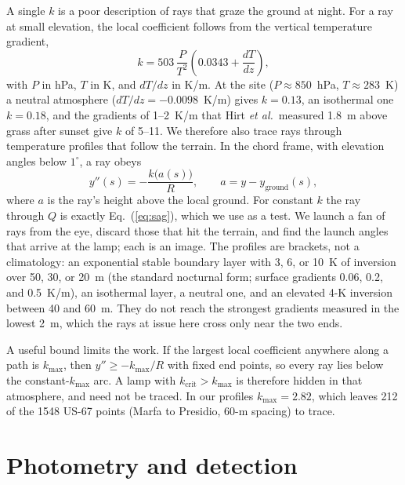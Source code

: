 \documentclass[aip,jap,amsmath,amssymb,reprint,floatfix]{revtex4-2}
\newcommand{\kc}{k_{\mathrm{crit}}}
\begin{document}
A single $k$ is a poor description of rays that graze the ground at night. For a ray at small elevation, the local coefficient follows from the vertical temperature gradient,\cite{Hirt2010}
\begin{equation}
k = 503\,\frac{P}{T^2}\left(0.0343 + \frac{dT}{dz}\right),
\label{eq:hirt}
\end{equation}
with $P$ in hPa, $T$ in K, and $dT/dz$ in K/m. At the site ($P\approx850$~hPa, $T\approx283$~K) a neutral atmosphere ($dT/dz=-0.0098$~K/m) gives $k=0.13$, an isothermal one $k=0.18$, and the gradients of 1--2~K/m that Hirt \textit{et al.}\ measured 1.8~m above grass after sunset give $k$ of 5--11.\cite{Hirt2010} We therefore also trace rays through temperature profiles that follow the terrain. In the chord frame, with elevation angles below $1^\circ$, a ray obeys
\begin{equation}
y''(s) = -\frac{k\big(a(s)\big)}{R},\qquad a = y - y_{\mathrm{ground}}(s),
\label{eq:ray}
\end{equation}
where $a$ is the ray's height above the local ground. For constant $k$ the ray through $Q$ is exactly Eq.~(\ref{eq:sag}), which we use as a test. We launch a fan of rays from the eye, discard those that hit the terrain, and find the launch angles that arrive at the lamp; each is an image. The profiles are brackets, not a climatology: an exponential stable boundary layer with 3, 6, or 10~K of inversion over 50, 30, or 20~m (the standard nocturnal form\cite{Stull1988}; surface gradients 0.06, 0.2, and 0.5~K/m), an isothermal layer, a neutral one, and an elevated 4-K inversion between 40 and 60~m. They do not reach the strongest gradients measured in the lowest 2~m, which the rays at issue here cross only near the two ends.

A useful bound limits the work. If the largest local coefficient anywhere along a path is $k_{\max}$, then $y''\ge-k_{\max}/R$ with fixed end points, so every ray lies below the constant-$k_{\max}$ arc. A lamp with $\kc>k_{\max}$ is therefore hidden in that atmosphere, and need not be traced. In our profiles $k_{\max}=2.82$, which leaves 212 of the 1548 US-67 points (Marfa to Presidio, 60-m spacing) to trace.

\section{Photometry and detection}\label{sec:photometry}
\end{document}
